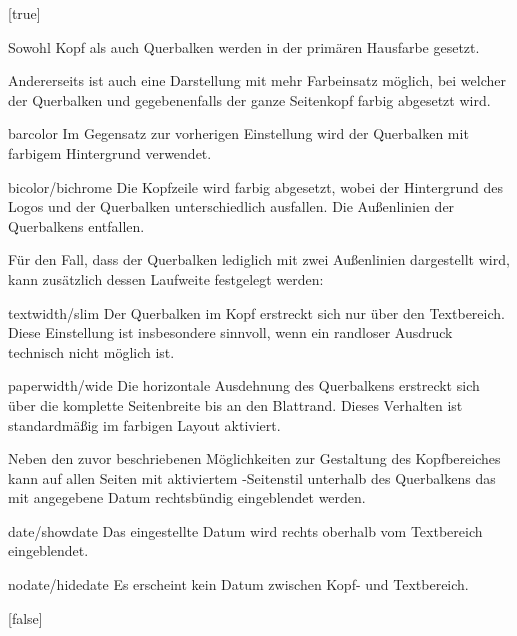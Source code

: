 \begin{Declaration*}{}
\begin{Declaration*}{}
\begin{Declaration*}{}
\begin{Declaration}[%
  v2.03;%
  v2.04!\Option{cdhead=barcolor}:nur farbig abgesetzter Querbalken;%
  v2.05!\Option{cdhead=date}:Datum zwischen Kopf- und Textbereich;%
]{}[true]
\begin{values}{}
  Sowohl Kopf als auch Querbalken werden in der primären Hausfarbe gesetzt.
\end{values}
%
Andererseits ist auch eine Darstellung mit mehr Farbeinsatz möglich, bei 
welcher der Querbalken und gegebenenfalls der ganze Seitenkopf farbig 
abgesetzt wird.
%
\begin{values}{}
\item[barcolor]
   Im Gegensatz zur vorherigen Einstellung wird der 
  Querbalken mit farbigem Hintergrund verwendet.
\item[bicolor/bichrome]
   Die Kopfzeile wird farbig abgesetzt, wobei der 
  Hintergrund des Logos und der Querbalken unterschiedlich ausfallen. Die 
  Außenlinien der Querbalkens entfallen.
\end{values}
%
Für den Fall, dass der Querbalken lediglich mit zwei Außenlinien dargestellt 
wird, kann zusätzlich dessen Laufweite festgelegt werden:
%
\begin{values}{}
\item[textwidth/slim]
  Der Querbalken im Kopf erstreckt sich nur über den Textbereich. Diese 
  Einstellung ist insbesondere sinnvoll, wenn ein randloser Ausdruck technisch 
  nicht möglich ist. 
\item[paperwidth/wide]
  Die horizontale Ausdehnung des Querbalkens erstreckt sich über die komplette 
  Seitenbreite bis an den Blattrand. Dieses Verhalten ist standardmäßig im 
  farbigen Layout aktiviert.
\end{values}
%
Neben den zuvor beschriebenen Möglichkeiten zur Gestaltung des Kopfbereiches 
kann auf allen Seiten mit aktiviertem -Seitenstil 
unterhalb des Querbalkens das mit  angegebene Datum rechtsbündig 
eingeblendet werden.
%
\begin{values}{}
\item[date/showdate]
  Das eingestellte Datum wird rechts oberhalb vom Textbereich eingeblendet.
\item[nodate/hidedate]
  Es erscheint kein Datum zwischen Kopf- und Textbereich.
\end{values}
\end{Declaration}

\begin{Declaration}[%
  v2.03!\Option{cdfoot=color}:farbiger Hintergrund der Fußzeile;%
  v2.03!\Option{cdfoot=\PValueName{Höhe}};%
]{}[false]%
\printdeclarationlist%
%
%
%


\end{Declaration}
\end{Declaration*}
\end{Declaration*}
\end{Declaration*}
